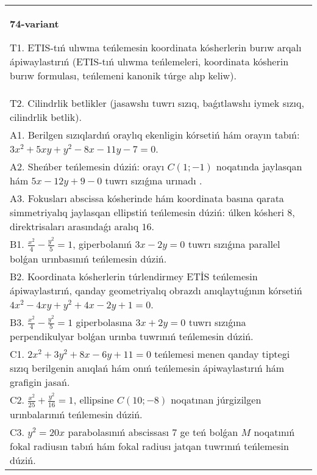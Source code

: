 \documentclass{article}
\begin{document}
\begin{tabular}{m{17cm}}
\textbf{74-variant}
\newline

T1. ETIS-tıń ulıwma teńlemesin koordinata kósherlerin burıw arqalı ápiwaylastırıń (ETIS-tıń ulıwma teńlemeleri, koordinata kósherin burıw formulası, teńlemeni kanonik túrge alıp keliw).\\

T2. Cilindrlik betlikler (jasawshı tuwrı sızıq, baǵıtlawshı iymek sızıq, cilindrlik betlik).\\

A1. Berilgen sızıqlardıń oraylıq ekenligin kórsetiń hám orayın tabıń: $3 x^{2}+5 xy+y^{2}-8 x-11 y-7=0$.\\

A2. Sheńber teńlemesin dúziń: orayı $C (1;-1) $ noqatında jaylasqan hám $5 x-12 y+9 -0$ tuwrı sızıǵına urınadı .\\

A3. Fokusları abscissa kósherinde hám koordinata basına qarata simmetriyalıq jaylasqan ellipstiń teńlemesin dúziń: úlken kósheri $8$, direktrisaları arasındaǵı aralıq $16$.\\

B1. $\frac{x^{2}}{4} - \frac{y^{2}}{5} = 1$, giperbolanıń $3x - 2y = 0$ tuwrı sızıǵına parallel bolǵan urınbasınıń teńlemesin dúziń.  \\

B2. Koordinata kósherlerin túrlendirmey ETİS teńlemesin ápiwaylastırıń, qanday geometriyalıq obrazdı anıqlaytuǵının kórsetiń $4x^{2} - 4xy + y^{2} + 4x - 2y + 1 = 0$.  \\

B3. $\frac{x^{2}}{4} - \frac{y^{2}}{5} = 1$ giperbolasına $3x + 2y = 0$ tuwrı sızıǵına perpendikulyar bolǵan urınba tuwrınıń teńlemesin dúziń.\\

C1. $2x^{2} + 3y^{2} + 8x - 6y + 11 = 0$ teńlemesi menen qanday tiptegi sızıq berilgenin anıqlań hám onıń teńlemesin ápiwaylastırıń hám grafigin jasań.  \\

C2. $\frac{x^{2}}{25} + \frac{y^{2}}{16} = 1$, ellipsine $C(10; - 8)$ noqatınan júrgizilgen urınbalarınıń teńlemesin dúziń.  \\

C3. $y^{2} = 20x$ parabolasınıń abscissası 7 ge teń bolǵan $M$ noqatınıń fokal radiusın tabıń hám fokal radiusı jatqan tuwrınıń teńlemesin dúziń.  \\

\end{tabular}
\vspace{1cm}
\end{document}
